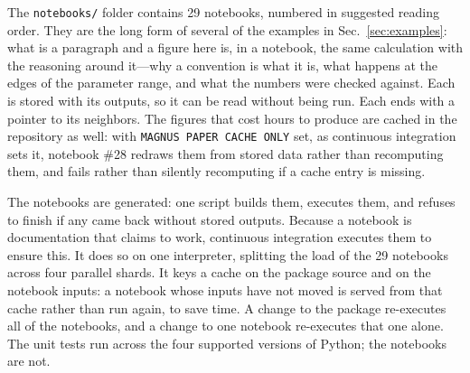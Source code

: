 \documentclass[final,5p,times,twocolumn,sort,compress]{elsarticle}
\makeatletter
\DeclareRobustCommand{\_}{%
  \ifmmode\nfss@text{\textunderscore}\else\textunderscore\allowbreak\fi}
\makeatother
\begin{document}
The {\tt notebooks/} folder contains 29 notebooks, numbered in suggested reading order. They are the long form of several of the examples in Sec.~\ref{sec:examples}: what is a paragraph and a figure here is, in a notebook, the same calculation with the reasoning around it---why a convention is what it is, what happens at the edges of the parameter range, and what the numbers were checked against. Each is stored with its outputs, so it can be read without being run. Each ends with a pointer to its neighbors. The figures that cost hours to produce are cached in the repository as well: with {\tt MAGNUS\_PAPER\_CACHE\_ONLY} set, as continuous integration sets it, notebook \#28 redraws them from stored data rather than recomputing them, and fails rather than silently recomputing if a cache entry is missing.

The notebooks are generated: one script builds them, executes them, and refuses to finish if any came back without stored outputs. Because a notebook is documentation that claims to work, continuous integration executes them to ensure this. It does so on one interpreter, splitting the load of the 29 notebooks across four parallel shards. It keys a cache on the package source and on the notebook inputs: a notebook whose inputs have not moved is served from that cache rather than run again, to save time. A change to the package re-executes all of the notebooks, and a change to one notebook re-executes that one alone. The unit tests run across the four supported versions of Python; the notebooks are not.
\end{document}
